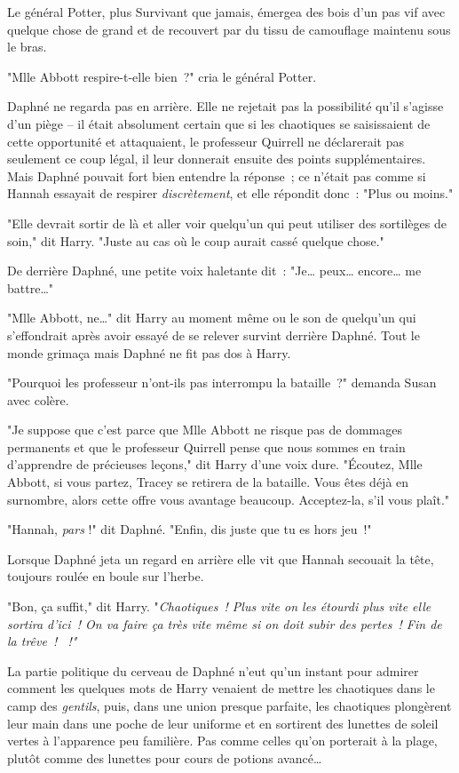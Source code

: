 Le général Potter, plus Survivant que jamais, émergea des bois d'un pas vif avec quelque chose de grand et de recouvert par du tissu de camouflage maintenu sous le bras.

"Mlle Abbott respire-t-elle bien~?" cria le général Potter.

Daphné ne regarda pas en arrière. Elle ne rejetait pas la possibilité qu'il s'agisse d'un piège -- il était absolument certain que si les chaotiques se saisissaient de cette opportunité et attaquaient, le professeur Quirrell ne déclarerait pas seulement ce coup légal, il leur donnerait ensuite des points supplémentaires. Mais Daphné pouvait fort bien entendre la réponse~; ce n'était pas comme si Hannah essayait de respirer \emph{discrètement}, et elle répondit donc~: "Plus ou moins."

"Elle devrait sortir de là et aller voir quelqu'un qui peut utiliser des sortilèges de soin," dit Harry. "Juste au cas où le coup aurait cassé quelque chose."

De derrière Daphné, une petite voix haletante dit~: "Je… peux… encore… me battre…"

"Mlle Abbott, ne…" dit Harry au moment même ou le son de quelqu'un qui s'effondrait après avoir essayé de se relever survint derrière Daphné. Tout le monde grimaça mais Daphné ne fit pas dos à Harry.

"Pourquoi les professeur n'ont-ils pas interrompu la bataille~?" demanda Susan avec colère.

"Je suppose que c'est parce que Mlle Abbott ne risque pas de dommages permanents et que le professeur Quirrell pense que nous sommes en train d'apprendre de précieuses leçons," dit Harry d'une voix dure. "Écoutez, Mlle Abbott, si vous partez, Tracey se retirera de la bataille. Vous êtes déjà en surnombre, alors cette offre vous avantage beaucoup. Acceptez-la, s'il vous plaît."

"Hannah, \emph{pars} !" dit Daphné. "Enfin, dis juste que tu es hors jeu~!"

Lorsque Daphné jeta un regard en arrière elle vit que Hannah secouait la tête, toujours roulée en boule sur l'herbe.

"Bon, ça suffit," dit Harry. "\emph{Chaotiques~! Plus vite on les étourdi plus vite elle sortira d'ici~! On va faire ça très vite même si on doit subir des pertes~! Fin de la trêve~! ~!"}

La partie politique du cerveau de Daphné n'eut qu'un instant pour admirer comment les quelques mots de Harry venaient de mettre les chaotiques dans le camp des \emph{gentils}, puis, dans une union presque parfaite, les chaotiques plongèrent leur main dans une poche de leur uniforme et en sortirent des lunettes de soleil vertes à l'apparence peu familière. Pas comme celles qu'on porterait à la plage, plutôt comme des lunettes pour cours de potions avancé…

